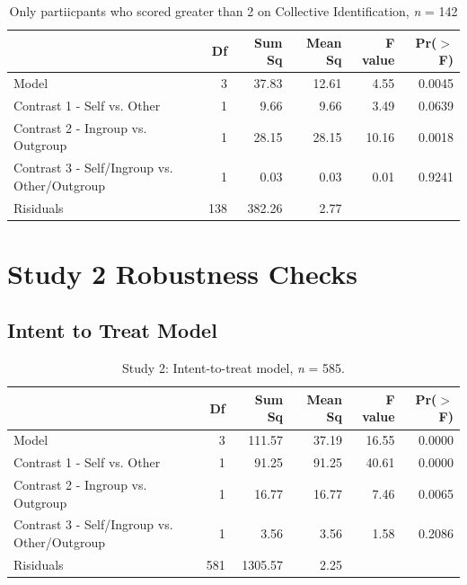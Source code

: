 \documentclass[12pt,]{article}
\begin{document}
\begin{table}[ht]
\centering
\begin{tabular}{lrrrrr}
  \hline
 & Df & Sum Sq & Mean Sq & F value & Pr($>$F) \\ 
  \hline
Model & 3 & 37.83 & 12.61 & 4.55 & 0.0045 \\ 
  Contrast 1 - Self vs. Other & 1 & 9.66 & 9.66 & 3.49 & 0.0639 \\ 
  Contrast 2 - Ingroup vs. Outgroup & 1 & 28.15 & 28.15 & 10.16 & 0.0018 \\ 
  Contrast 3 - Self/Ingroup vs. Other/Outgroup & 1 & 0.03 & 0.03 & 0.01 & 0.9241 \\ 
  Risiduals & 138 & 382.26 & 2.77 &  &  \\ 
   \hline
\end{tabular}
\caption{Only partiicpants who scored greater than 2 on Collective Identification, \emph{n} = 142} 
\label{high_ID}
\end{table}


\newpage
\section{Study 2 Robustness Checks}
\label{appendix:robust2}


\subsection{Intent to Treat Model}
\label{appendix:itt2}


\begin{table}[ht]
\centering
\begin{tabular}{lrrrrr}
  \hline
 & Df & Sum Sq & Mean Sq & F value & Pr($>$F) \\ 
  \hline
Model & 3 & 111.57 & 37.19 & 16.55 & 0.0000 \\ 
  Contrast 1 - Self vs. Other & 1 & 91.25 & 91.25 & 40.61 & 0.0000 \\ 
  Contrast 2 - Ingroup vs. Outgroup & 1 & 16.77 & 16.77 & 7.46 & 0.0065 \\ 
  Contrast 3 - Self/Ingroup vs. Other/Outgroup & 1 & 3.56 & 3.56 & 1.58 & 0.2086 \\ 
  Risiduals & 581 & 1305.57 & 2.25 &  &  \\ 
   \hline
\end{tabular}
\caption{Study 2: Intent-to-treat model, \emph{n} = 585. } 
\label{ITT2}
\end{table}
\end{document}
